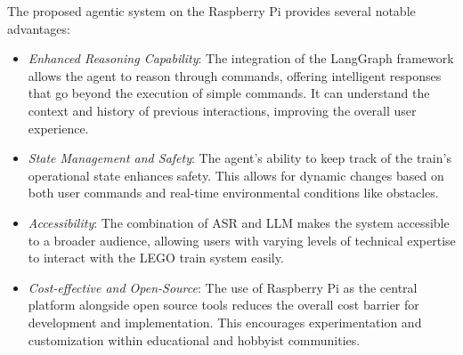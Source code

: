 The proposed agentic system on the Raspberry Pi provides several notable advantages:

\begin{itemize}
    \item \textit{Enhanced Reasoning Capability}: The integration of the LangGraph framework allows the agent to reason through commands, offering intelligent responses that go beyond the execution of simple commands. It can understand the context and history of previous interactions, improving the overall user experience.

    \item \textit{State Management and Safety}: The agent's ability to keep track of the train's operational state enhances safety. This allows for dynamic changes based on both user commands and real-time environmental conditions like obstacles.

    \item \textit{Accessibility}: The combination of ASR and LLM makes the system accessible to a broader audience, allowing users with varying levels of technical expertise to interact with the LEGO train system easily.

    \item \textit{Cost-effective and Open-Source}: The use of Raspberry Pi as the central platform alongside open source tools reduces the overall cost barrier for development and implementation. This encourages experimentation and customization within educational and hobbyist communities.
\end{itemize}